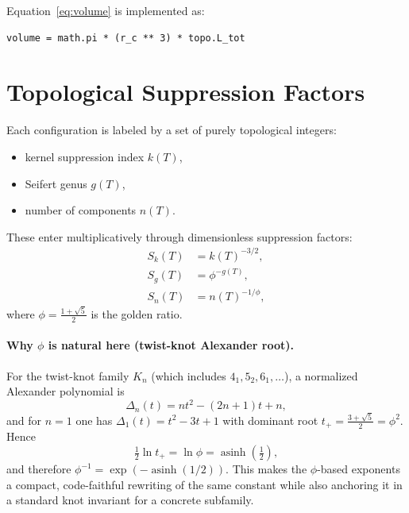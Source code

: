 \documentclass[11pt,a4paper]{article}
\begin{document}
        Equation~\eqref{eq:volume} is implemented as:
        \begin{verbatim}
volume = math.pi * (r_c ** 3) * topo.L_tot
        \end{verbatim}

    \section{Topological Suppression Factors}

        Each configuration is labeled by a set of purely topological integers:
        \begin{itemize}
            \item kernel suppression index $k(T)$,
            \item Seifert genus $g(T)$,
            \item number of components $n(T)$.
        \end{itemize}

        These enter multiplicatively through dimensionless suppression factors:
        \begin{align}
            S_k(T) &= k(T)^{-3/2}, \\
            S_g(T) &= \phi^{-g(T)}, \\
            S_n(T) &= n(T)^{-1/\phi},
        \end{align}
        where $\phi = \tfrac{1+\sqrt{5}}{2}$ is the golden ratio.

        \paragraph{Why $\phi$ is natural here (twist-knot Alexander root).}
        For the twist-knot family $K_n$ (which includes $4_1, 5_2, 6_1,\dots$), a normalized Alexander polynomial is
        \begin{equation}
            \Delta_n(t) = n t^2 - (2n+1)t + n,
            \label{eq:alexander_twist}
        \end{equation}
        and for $n=1$ one has $\Delta_1(t)=t^2-3t+1$ with dominant root $t_+=\tfrac{3+\sqrt{5}}{2}=\phi^2$.
        Hence
        \[
            \tfrac12 \ln t_+ = \ln\phi = \operatorname{asinh}\!\left(\tfrac12\right),
        \]
        and therefore $\phi^{-1}=\exp(-\operatorname{asinh}(1/2))$. This makes the $\phi$-based exponents a compact,
        code-faithful rewriting of the same constant while also anchoring it in a standard knot invariant for a concrete
        subfamily. \cite{Lee2025DoubleTwist}
\end{document}
